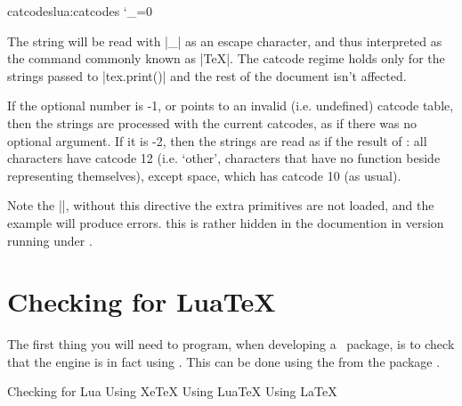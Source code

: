 \begin{texexample}{catcodes}{lua:catcodes}
\bgroup
{}
\catcode`\_=0
\egroup
{}
\end{texexample}

The string will be read with |_| as an escape character, and thus interpreted as the command commonly known as |\TeX|. The catcode regime holds only for the strings passed to |tex.print()| and the rest of the document isn't affected.

If the optional number is -1, or points to an invalid (i.e. undefined) catcode table, then the strings are processed with the current catcodes, as if there was no optional argument. If it is -2, then the strings are read as if the result of \cmd{\detokenize}: all characters have catcode 12 (i.e. `other', characters that have no function beside representing themselves), except space, which has catcode 10 (as usual).


Note the ||, without this directive the extra primitives are not loaded, and the example will produce errors. this is rather hidden in the documention in version \the\luatexversion running under \formatname.


\section{Checking for LuaTeX}

The first thing you will need to program, when developing a \luatex\ package, is to check that the engine is in fact using \luatex. This can be done using the  from the package . 

\begin{texexample}{Checking for Lua}{}
\ifxetex
  Using XeTeX
\else
  \ifluatex
   Using LuaTeX
  \else
   Using LaTeX
  \fi
\fi
\end{texexample}


